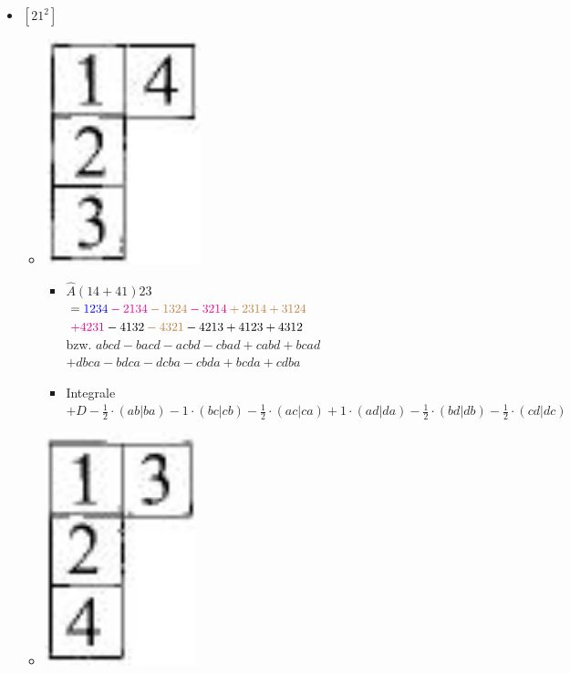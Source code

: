 \documentclass[12pt,a4paper]{article}
\newcommand{\h}[2]{\color{#1} #2 \color{black} }
\newcommand{\equalInM}[1]{\h{blue}{#1}} %
\newcommand{\equalInTableau}[1]{\h{magenta}{#1}} %
\newcommand{\equalAntiSym}[1]{\h{brown}{#1}} %
\begin{document}
\begin{itemize}
\begin{itemize}
\begin{itemize}
\end{itemize}
\end{itemize}
\item $\left[ 2 1 ^2\right]$
\begin{itemize}
\item \includegraphics[scale=0.2]{build/young-21hoch2-14.png}
\begin{itemize}
\item  $\hat{A} \left(14+41
 \right) 23$ \\ 
 $= \equalInM{1234}  \equalInTableau{- 2134} \equalAntiSym{- 1324} \equalInTableau{- 3214 } \equalAntiSym{+ 2314 } \equalAntiSym{+ 3124 }
 $\\
 $ \equalInTableau{+4231} - 4132 \equalAntiSym{- 4321} - 4213 + 4123 + 4312
 $ \\
 bzw. $ abcd - bacd - acbd - cbad + cabd + bcad$\\
 $+dbca - bdca - dcba - cbda + bcda + cdba$
 \item Integrale \\
 $ + D - \frac{1}{2} \cdot (ab|ba) - 1 \cdot (bc|cb) - \frac{1}{2} \cdot (ac|ca) + 1 \cdot (ad|da) - \frac{1}{2} \cdot (bd|db) - \frac{1}{2} \cdot (cd|dc)$
\end{itemize}
\item \includegraphics[scale=0.2]{build/young-21hoch2-13.png}

\end{itemize}
\end{itemize}
\end{document}
